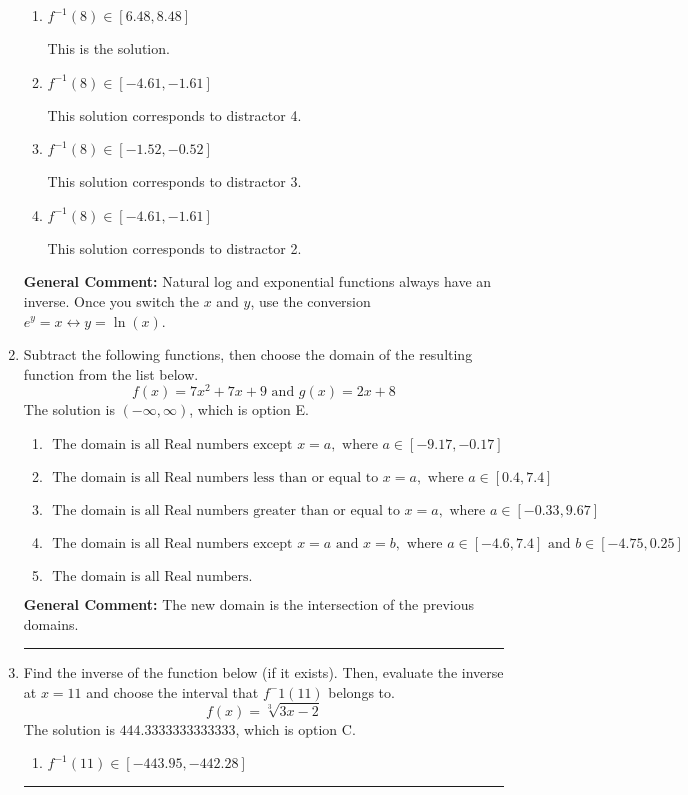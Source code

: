 \documentclass{extbook}[14pt]
\newcommand{\litem}[1]{\item #1

\rule{\textwidth}{0.4pt}}
\begin{document}
\begin{enumerate}
{\begin{enumerate}[label=\Alph*.]
 This solution corresponds to distractor 1.
\item \( f^{-1}(8) \in [6.48, 8.48] \)

 This is the solution.
\item \( f^{-1}(8) \in [-4.61, -1.61] \)

 This solution corresponds to distractor 4.
\item \( f^{-1}(8) \in [-1.52, -0.52] \)

 This solution corresponds to distractor 3.
\item \( f^{-1}(8) \in [-4.61, -1.61] \)

 This solution corresponds to distractor 2.
\end{enumerate}

\textbf{General Comment:} Natural log and exponential functions always have an inverse. Once you switch the $x$ and $y$, use the conversion $ e^y = x \leftrightarrow y=\ln(x)$.
}
\litem{
Subtract the following functions, then choose the domain of the resulting function from the list below.
\[ f(x) = 7x^{2} +7 x + 9 \text{ and } g(x) = 2x + 8 \]The solution is \( (-\infty, \infty) \), which is option E.\begin{enumerate}[label=\Alph*.]
\item \( \text{ The domain is all Real numbers except } x = a, \text{ where } a \in [-9.17, -0.17] \)


\item \( \text{ The domain is all Real numbers less than or equal to } x = a, \text{ where } a \in [0.4, 7.4] \)


\item \( \text{ The domain is all Real numbers greater than or equal to } x = a, \text{ where } a \in [-0.33, 9.67] \)


\item \( \text{ The domain is all Real numbers except } x = a \text{ and } x = b, \text{ where } a \in [-4.6, 7.4] \text{ and } b \in [-4.75, 0.25] \)


\item \( \text{ The domain is all Real numbers. } \)


\end{enumerate}

\textbf{General Comment:} The new domain is the intersection of the previous domains.
}
\litem{
Find the inverse of the function below (if it exists). Then, evaluate the inverse at $x = 11$ and choose the interval that $f^-1(11)$ belongs to.
\[ f(x) = \sqrt[3]{3 x - 2} \]The solution is \( 444.3333333333333 \), which is option C.\begin{enumerate}[label=\Alph*.]
\item \( f^{-1}(11) \in [-443.95, -442.28] \)


\end{enumerate}}
\end{enumerate}
\end{document}
